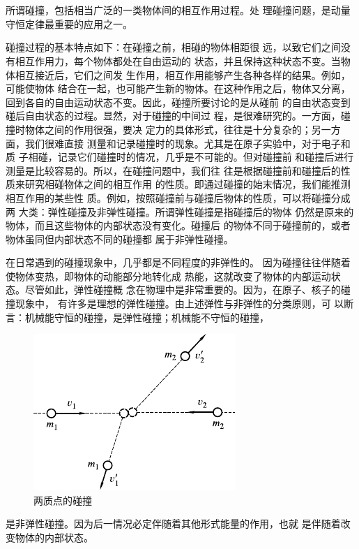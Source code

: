 \section[碰撞]{}\label{sec:08.03}

所谓碰撞，包括相当广泛的一类物体间的相互作用过程。处
理碰撞问题，是动量守恒定律最重要的应用之一。

碰撞过程的基本特点如下：在碰撞之前，相碰的物体相距很
远，以致它们之间没有相互作用力，每个物体都处在自由运动的
状态，并且保持这种状态不变。当物体相互接近后，它们之间发
生作用，相互作用能够产生各种各样的结果。例如，可能使物体
结合在一起，也可能产生新的物体。在这种作用之后，物体又分离，
回到各自的自由运动状态不变。因此，碰撞所要讨论的是从碰前
的自由状态变到碰后自由状态的过程。显然，对于碰撞的中间过
程，是很难研究的。一方面，碰撞时物体之间的作用很强，要决
定力的具体形式，往往是十分复杂的；另一方面，我们很难直接
测量和记录碰撞时的现象。尤其是在原子实验中，对于电子和质
子相碰，记录它们碰撞时的情况，几乎是不可能的。但对碰撞前
和碰撞后进行测量是比较容易的。所以，在碰撞问题中，我们往
往是根据碰撞前和碰撞后的性质来研究相碰物体之间的相互作用
的性质。即通过碰撞的始末情况，我们能推测相互作用的某些性
质。例如，按照碰撞前与碰撞后物体的性质，可以将碰撞分成两
大类：弹性碰撞及非弹性碰撞。所谓弹性碰撞是指碰撞后的物体
仍然是原来的物体，而且这些物体的内部状态没有变化。碰撞后
的物体不同于碰撞前的，或者物体虽同但内部状态不同的碰撞都
属于非弹性碰撞。

在日常遇到的碰撞现象中，几乎都是不同程度的非弹性的。
因为碰撞往往伴随着使物体变热，即物体的动能部分地转化成
热能，这就改变了物体的内部运动状态。尽管如此，弹性碰撞概
念在物理中是非常重要的。因为，在原子、核子的碰撞现象中，
有许多是理想的弹性碰撞。由上述弹性与非弹性的分类原则，可
以断言：机械能守恒的碰撞，是弹性碰撞；机械能不守恒的碰撞，
\begin{figure}
  \centering
  \includegraphics{figure/fig08.05}
  \caption{两质点的碰撞}
  \label{fig:08.05}
\end{figure}
是非弹性碰撞。因为后一情况必定伴随着其他形式能量的作用，也就
是伴随着改变物体的内部状态。

